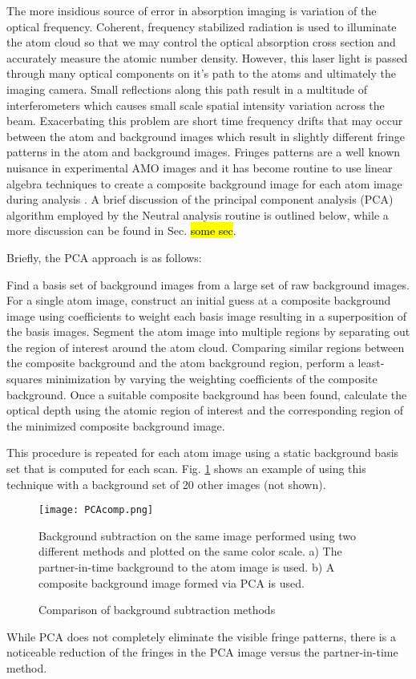 The more insidious source of error in absorption imaging is variation of the optical frequency. 
Coherent, frequency stabilized radiation is used to illuminate the atom cloud so that we may control the optical absorption cross section and accurately measure the atomic number density. 
However, this laser light is passed through many optical components on it's path to the atoms and ultimately the imaging camera. 
Small reflections along this path result in a multitude of interferometers which causes small scale spatial intensity variation across the beam. 
Exacerbating this problem are short time frequency drifts that may occur between the atom and background images which result in slightly different fringe patterns in the atom and background images. 
Fringes patterns are a well known nuisance in experimental AMO images and it has become routine to use linear algebra techniques to create a composite background image for each atom image during analysis \cite{Segal2009}. 
A brief discussion of the principal component analysis (PCA) algorithm employed by the Neutral analysis routine is outlined below, while a more discussion can be found in Sec. \hl{some sec}. 

Briefly, the PCA approach is as follows:
\begin{outline}[enumerate]
	\1 Find a basis set of background images from a large set of raw background images.
	\1 For a single atom image, construct an initial guess at a composite background image using coefficients to weight each basis image resulting in a superposition of the basis images.
	\1 Segment the atom image into multiple regions by separating out the region of interest around the atom cloud.
	\1 Comparing similar regions between the composite background and the atom background region, perform a least-squares minimization by varying the weighting coefficients of the composite background.
	\1 Once a suitable composite background has been found, calculate the optical depth using the atomic region of interest and the corresponding region of the minimized composite background image.
\end{outline}
This procedure is repeated for each atom image using a static background basis set that is computed for each scan.
Fig. \ref{fig:PCAcomp} shows an example of using this technique with a background set of 20 other images (not shown).
	\begin{figure}
	\centerline{
		\texttt{[image: PCAcomp.png]}}
		\caption{Comparison of background subtraction methods}{Background subtraction on the same image performed using two different methods and plotted on the same color scale. a) The partner-in-time background to the atom image is used. b) A composite background image formed via PCA is used.}
		 \label{fig:PCAcomp}
	\end{figure}
While PCA does not completely eliminate the visible fringe patterns, there is a noticeable reduction of the fringes in the PCA image versus the partner-in-time method.

